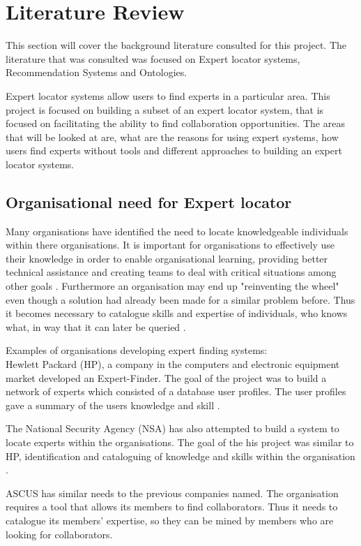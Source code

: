 \documentclass[a4paper,oneside,11pt]{report}
\begin{document}
\chapter{Literature Review}
This section will cover the background literature consulted for this project. The literature that was consulted was focused on Expert locator systems, Recommendation Systems and Ontologies. 

Expert locator systems allow users to find experts in a particular area.
This project is focused on building a subset of an expert locator system, that is focused on facilitating the ability to find collaboration opportunities. The areas that will be looked at are, what are the reasons for using expert systems, how users find experts without tools and different approaches to building an expert locator systems.
\section{Organisational need for Expert locator}
Many organisations have identified the need to locate knowledgeable individuals within there organisations. It is important for organisations to effectively use their knowledge in order to enable organisational learning, providing better technical assistance and creating teams to deal with critical situations among other goals  \autocite{ackerman2003sharing}. Furthermore an organisation may end up "reinventing the wheel" even though a solution had already been made for a similar problem before. Thus it becomes necessary to catalogue skills and expertise of individuals, who knows what,  in way that it can later be queried \autocite{fernandez2000}.

Examples of organisations developing expert finding systems: \\
Hewlett Packard (HP), a company in the computers and electronic equipment market developed  an Expert-Finder. The goal of the project was to build a network of experts which consisted of a database user profiles. The user profiles gave a summary of the users knowledge and skill \autocite{fernandez2000}.
 
The National Security Agency (NSA) has also attempted to build a system to locate experts within the organisations. The goal of the his project was similar to HP, identification and cataloguing of knowledge and skills within the organisation \autocite{fernandez2000}.

ASCUS has similar needs to the previous companies named. The organisation requires a tool that allows its members to find collaborators. Thus it needs to catalogue its members' expertise, so they can be mined by members who are looking for collaborators. 
	
\end{document}
